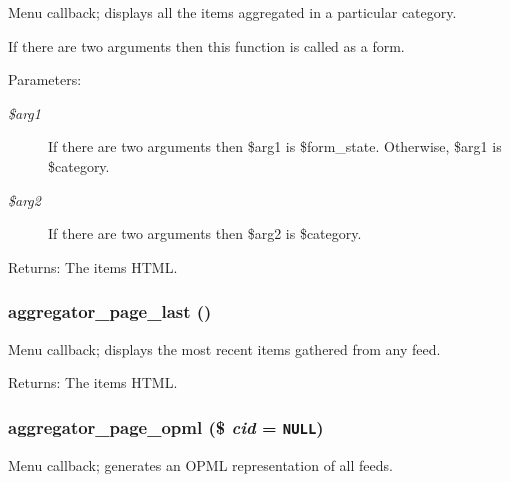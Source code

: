 Menu callback; displays all the items aggregated in a particular category.

If there are two arguments then this function is called as a form.

\begin{Desc}
\item[Parameters:]
\begin{description}
\item[{\em \$arg1}]If there are two arguments then \$arg1 is \$form\_\-state. Otherwise, \$arg1 is \$category. \item[{\em \$arg2}]If there are two arguments then \$arg2 is \$category. \end{description}
\end{Desc}
\begin{Desc}
\item[Returns:]The items HTML. \end{Desc}
\hypertarget{aggregator_8pages_8inc_59d236d98e0725864c55ccf6f1ec7eab}{
\subsubsection[{aggregator\_\-page\_\-last}]{\setlength{\rightskip}{0pt plus 5cm}aggregator\_\-page\_\-last ()}}
\label{aggregator_8pages_8inc_59d236d98e0725864c55ccf6f1ec7eab}


Menu callback; displays the most recent items gathered from any feed.

\begin{Desc}
\item[Returns:]The items HTML. \end{Desc}
\hypertarget{aggregator_8pages_8inc_8d85211ae223530fc56bad7caf9a9b5d}{
\subsubsection[{aggregator\_\-page\_\-opml}]{\setlength{\rightskip}{0pt plus 5cm}aggregator\_\-page\_\-opml (\$ {\em cid} = {\tt NULL})}}
\label{aggregator_8pages_8inc_8d85211ae223530fc56bad7caf9a9b5d}


Menu callback; generates an OPML representation of all feeds.

